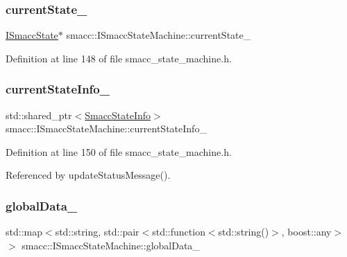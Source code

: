 \subsubsection{\texorpdfstring{current\+State\+\_\+}{currentState\_}}
{\footnotesize\ttfamily \hyperlink{classsmacc_1_1ISmaccState}{I\+Smacc\+State}$\ast$ smacc\+::\+I\+Smacc\+State\+Machine\+::current\+State\+\_\+\hspace{0.3cm}{\ttfamily [protected]}}



Definition at line 148 of file smacc\+\_\+state\+\_\+machine.\+h.

\mbox{\label{classsmacc_1_1ISmaccStateMachine_a95e42f735cecdc231ad5372bf9fe7eaf}} 
\subsubsection{\texorpdfstring{current\+State\+Info\+\_\+}{currentStateInfo\_}}
{\footnotesize\ttfamily std\+::shared\+\_\+ptr$<$\hyperlink{classsmacc_1_1introspection_1_1SmaccStateInfo}{Smacc\+State\+Info}$>$ smacc\+::\+I\+Smacc\+State\+Machine\+::current\+State\+Info\+\_\+\hspace{0.3cm}{\ttfamily [protected]}}



Definition at line 150 of file smacc\+\_\+state\+\_\+machine.\+h.



Referenced by update\+Status\+Message().

\mbox{\label{classsmacc_1_1ISmaccStateMachine_ad2f9dae184ea942db632ac4532a10a91}} 
\subsubsection{\texorpdfstring{global\+Data\+\_\+}{globalData\_}}
{\footnotesize\ttfamily std\+::map$<$std\+::string, std\+::pair$<$std\+::function$<$std\+::string()$>$, boost\+::any$>$ $>$ smacc\+::\+I\+Smacc\+State\+Machine\+::global\+Data\+\_\+\hspace{0.3cm}{\ttfamily [private]}}



